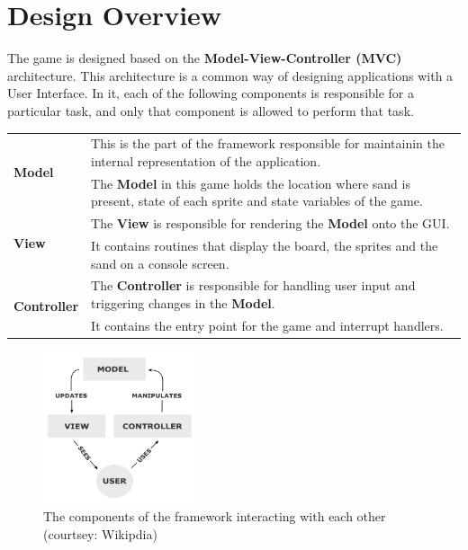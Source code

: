 \section{Design Overview}

The game is designed based on the \textbf{Model-View-Controller (MVC)} architecture.
This architecture is a common way of designing applications with a User Interface.
In it, each of the following components is responsible for a particular task, and only that component is allowed to perform that task.

\begin{table}[H]
  \centering
  \bgroup
  \def\arraystretch{1.5}
  \begin{tabularx}{\textwidth}{|p{3cm}|X|}

    \hline
    \multirow{2}{*}{\textbf{Model}}  
      & This is the part of the framework responsible for maintainin the internal representation of the application.                            \\
      & The \textbf{Model} in this game holds the location where sand is present, state of each sprite and state variables of the game.         \\
    \hline

    \multirow{2}{*}{\textbf{View}}   
      & The \textbf{View} is responsible for rendering the \textbf{Model} onto the GUI.                                                         \\
      & It contains routines that display the board, the sprites and the sand on a console screen.                                              \\
    \hline

    \multirow{2}{*}{\textbf{Controller}} 
      & The \textbf{Controller} is responsible for handling user input and triggering changes in the \textbf{Model}.                            \\
      & It contains the entry point for the game and interrupt handlers.                                                                        \\
    \hline

  \end{tabularx}
  \egroup
\end{table}

\begin{figure}[H]
  \centering
  \includegraphics[width=0.4\textwidth]{images/mvc-process.png}
  \caption{\label{fig:mvc-process} The components of the framework interacting with each other (courtsey: Wikipdia)}
\end{figure}



